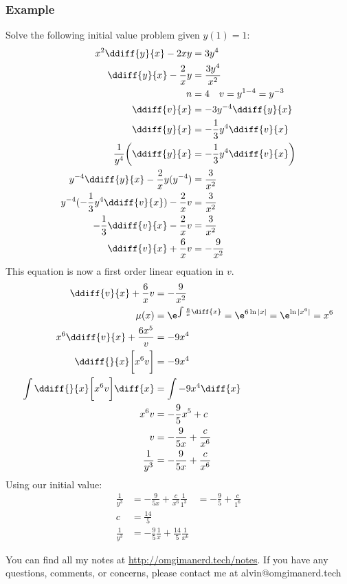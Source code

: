 \documentclass{math}
\begin{document}
\subsubsection*{Example}
Solve the following initial value problem given \( y(1) = 1 \):
\begin{align*}
  x^2\ddiff{y}{x}-2xy &= 3y^4 \\
  \ddiff{y}{x}-\frac{2}{x}y &= \frac{3y^4}{x^2} \\
  n &= 4 \quad v = y^{1-4} = y^{-3} \\
  \ddiff{v}{x} &= -3y^{-4}\ddiff{y}{x} \\
  \ddiff{y}{x} &= -\frac{1}{3}y^4\ddiff{v}{x} \\
  \frac{1}{y^4}\bigg(\ddiff{y}{x} &= -\frac{1}{3}y^4\ddiff{v}{x}\bigg) \\
  y^{-4}\ddiff{y}{x}-\frac{2}{x}y(y^{-4}) &= \frac{3}{x^2} \\
  y^{-4}(-\frac{1}{3}y^4\ddiff{v}{x})-\frac{2}{x}v &= \frac{3}{x^2} \\
  -\frac{1}{3}\ddiff{v}{x}-\frac{2}{x}v &= \frac{3}{x^2} \\
  \ddiff{v}{x}+\frac{6}{x}v &= -\frac{9}{x^2}
\end{align*}
This equation is now a first order linear equation in \( v \).
\begin{align*}
  \ddiff{v}{x}+\frac{6}{x}v &= -\frac{9}{x^2} \\
  \mu(x) &= \e^{\int\frac{6}{x}\diff{x}} = \e^{6\ln|x|} = \e^{\ln|x^6|} = x^6 \\
  x^6\ddiff{v}{x}+\frac{6x^5}v &= -9x^4 \\
  \ddiff{}{x}\bigg[x^6v\bigg] &= -9x^4 \\
  \int\ddiff{}{x}\bigg[x^6v\bigg]\diff{x} &= \int-9x^4\diff{x} \\
  x^6v &= -\frac{9}{5}x^5+c \\
  v &= -\frac{9}{5x}+\frac{c}{x^6} \\
  \frac{1}{y^3} &= -\frac{9}{5x}+\frac{c}{x^6}
\end{align*}
Using our initial value:
\begin{align*}
  \frac{1}{y^3} &= -\frac{9}{5x}+\frac{c}{x^6}
  \frac{1}{1^3} &= -\frac{9}{5}+\frac{c}{1^6} \\
  c &= \frac{14}{5} \\
  \frac{1}{y^3} &= -\frac{9}{5}\frac{1}{x}+\frac{14}{5}\frac{1}{x^6}
\end{align*}

\begin{center}
  You can find all my notes at \url{http://omgimanerd.tech/notes}. If you have
  any questions, comments, or concerns, please contact me at
  alvin@omgimanerd.tech
\end{center}
\end{document}
